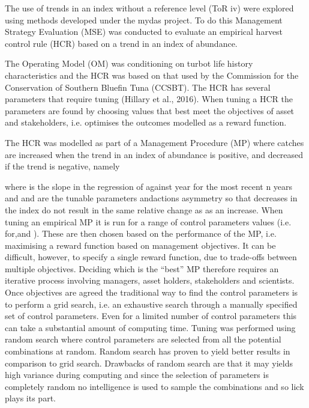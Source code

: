 \documentclass[12pt,doublespacing,a4paper]{ouparticle}
\begin{document}
The use of trends in an index without a reference level (ToR iv) were explored using methods developed under the mydas project.  To do this Management Strategy Evaluation (MSE) was conducted to evaluate an empirical harvest control rule (HCR) based on a trend in an index of abundance. 

The  Operating Model (OM) was conditioning on turbot life history characteristics and the HCR was based on that used by the Commission for the Conservation of Southern Bluefin Tuna (CCSBT). The HCR has several parameters that require tuning (Hillary et al., 2016). When tuning a HCR the parameters are found by choosing values that best meet the objectives of  asset and stakeholders, i.e. optimises the outcomes modelled as a reward function. 

The HCR was modelled as part of a  Management Procedure (MP) where catches are increased when the trend in an index of abundance is positive, and decreased if the trend is negative, namely







where  is the slope in the regression of  against year for the most recent n years and  and  are  the tunable parameters andactions asymmetry so that decreases in the index do not result in the same relative change as as an increase.
When tuning an empirical MP it is run for a range of control parameters values (i.e. for,and ). These are then chosen based on the performance of the MP, i.e.  maximising a reward function based on management objectives. It can be difficult, however, to specify a single reward function, due to trade-offs between multiple objectives. Deciding which is the “best” MP therefore requires an iterative process involving managers, asset holders, stakeholders and scientists.
Once objectives are agreed the traditional way to find the control parameters is to perform  a grid search, i.e. an exhaustive search through a manually specified set of control parameters. Even for a limited number of control parameters this can take a substantial amount of computing time. Tuning was performed using random search where control parameters are selected from all the potential combinations at random.  Random search has proven to yield better results in comparison to grid search. Drawbacks of random search are that it may yields high variance during computing and since the selection of parameters is completely random no intelligence is used to sample the combinations and so lick plays its part. 
\end{document}
